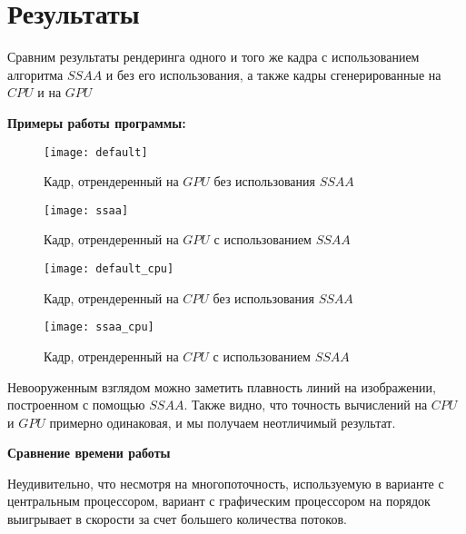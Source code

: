 \section{Результаты}
Сравним результаты рендеринга одного и того же кадра с использованием алгоритма $SSAA$ и без его использования, а также кадры сгенерированные на $CPU$ и на $GPU$

\textbf{Примеры работы программы:}
\begin{center}

\begin{figure}[h!]
    \ContinuedFloat*
    \centering
    \texttt{[image: default]}
    \caption{Кадр, отрендеренный на $GPU$ без использования $SSAA$}
\end{figure}

\begin{figure}[h!]
    \ContinuedFloat
    \centering
    \texttt{[image: ssaa]}
    \caption{Кадр, отрендеренный на $GPU$ с использованием $SSAA$}
\end{figure}

\begin{figure}[h!]
    \ContinuedFloat*
    \centering
    \texttt{[image: default\_cpu]}
    \caption{Кадр, отрендеренный на $CPU$ без использования $SSAA$}
\end{figure}

\begin{figure}[h!]
    \ContinuedFloat
    \centering
    \texttt{[image: ssaa\_cpu]}
    \caption{Кадр, отрендеренный на $CPU$ с использованием $SSAA$}
\end{figure}

\end{center}

Невооруженным взглядом можно заметить плавность линий на изображении, построенном с помощью $SSAA$. Также видно, что точность вычислений на $CPU$ и $GPU$ примерно одинаковая, и мы получаем неотличимый результат.

\textbf{Сравнение времени работы}

Неудивительно, что несмотря на многопоточность, используемую в варианте с центральным процессором, вариант с графическим процессором на порядок выигрывает в скорости за счет большего количества потоков.


